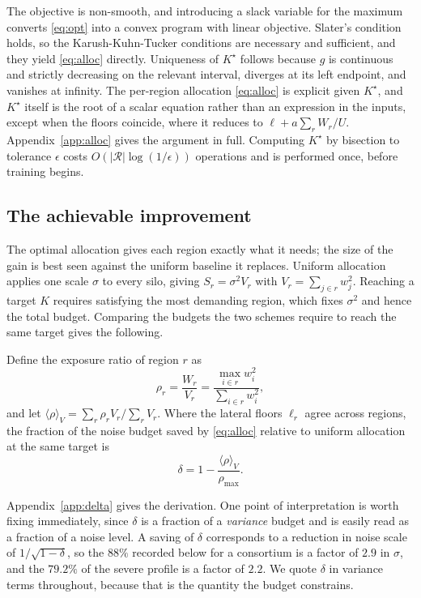 \documentclass[acmsmall,screen,review,anonymous]{acmart}
\theoremstyle{acmdefinition}%
\newcommand{\Reg}{\mathcal{R}}
\begin{document}
The objective is non-smooth, and introducing a slack variable for the maximum
converts \eqref{eq:opt} into a convex program with linear objective. Slater's
condition holds, so the Karush-Kuhn-Tucker conditions are necessary and
sufficient, and they yield \eqref{eq:alloc} directly. Uniqueness of $K^{\star}$
follows because $g$ is continuous and strictly decreasing on the relevant
interval, diverges at its left endpoint, and vanishes at infinity. The per-region
allocation \eqref{eq:alloc} is explicit given $K^{\star}$, and $K^{\star}$ itself is
the root of a scalar equation rather than an expression in the inputs, except when
the floors coincide, where it reduces to $\ell + a\sum_r W_r / U$.
Appendix~\ref{app:alloc} gives the argument in full. Computing $K^\star$ by
bisection to tolerance $\epsilon$ costs $O(|\Reg| \log(1/\epsilon))$ operations
and is performed once, before training begins.

\subsection{The achievable improvement}

The optimal allocation gives each region exactly what it needs; the size of the gain is best seen against the uniform baseline it replaces. Uniform allocation applies one scale $\sigma$ to every silo, giving $S_r = \sigma^2
V_r$ with $V_r = \sum_{j \in r} w_j^2$. Reaching a target $K$ requires satisfying
the most demanding region, which fixes $\sigma^2$ and hence the total budget.
Comparing the budgets the two schemes require to reach the same target gives the
following.

\begin{corollary}
\label{cor:delta}
Define the exposure ratio of region $r$ as
\begin{equation}
\rho_r = \frac{W_r}{V_r} = \frac{\max_{i \in r} w_i^2}{\sum_{i \in r} w_i^2},
\end{equation}
and let $\langle \rho \rangle_V = \sum_r \rho_r V_r / \sum_r V_r$. Where the
lateral floors $\ell_r$ agree across regions, the fraction of the noise budget
saved by \eqref{eq:alloc} relative to uniform allocation at the same target is
\begin{equation}
\delta = 1 - \frac{\langle \rho \rangle_V}{\rho_{\max}} .
\label{eq:delta}
\end{equation}
\end{corollary}

Appendix~\ref{app:delta} gives the derivation. One point of interpretation is worth
fixing immediately, since $\delta$ is a fraction of a \emph{variance} budget and is
easily read as a fraction of a noise level. A saving of $\delta$ corresponds to a
reduction in noise scale of $1/\sqrt{1-\delta}$, so the $88\%$ recorded below for a
consortium is a factor of $2.9$ in $\sigma$, and the $79.2\%$ of the severe profile
is a factor of $2.2$. We quote $\delta$ in variance terms throughout, because that
is the quantity the budget constrains.
\end{document}
